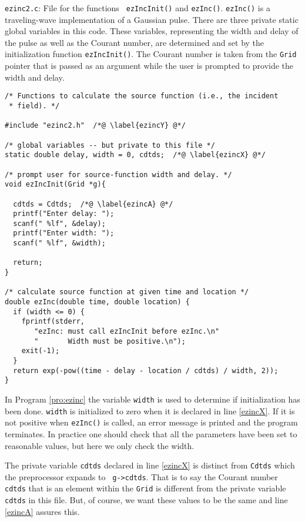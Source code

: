 \begin{program} {\tt ezinc2.c}: File for the functions {\tt
    ezIncInit()} and {\tt ezInc()}.  {\tt ezInc()} is a traveling-wave
  implementation of a Gaussian pulse.  There are three private static
  global variables in this code.  These variables, representing the
  width and delay of the pulse as well as the Courant number, are
  determined and set by the initialization function {\tt ezIncInit()}.
  The Courant number is taken from the {\tt Grid} pointer that is
  passed as an argument while the user is prompted to provide the
  width and delay.
\label{pro:ezinc}
\codemiddle
\begin{lstlisting}
/* Functions to calculate the source function (i.e., the incident
 * field). */ 

#include "ezinc2.h"  /*@ \label{ezincY} @*/

/* global variables -- but private to this file */
static double delay, width = 0, cdtds;  /*@ \label{ezincX} @*/

/* prompt user for source-function width and delay. */
void ezIncInit(Grid *g){

  cdtds = Cdtds;  /*@ \label{ezincA} @*/
  printf("Enter delay: ");
  scanf(" %lf", &delay);
  printf("Enter width: ");
  scanf(" %lf", &width);

  return;
}

/* calculate source function at given time and location */
double ezInc(double time, double location) {
  if (width <= 0) {
    fprintf(stderr,
       "ezInc: must call ezIncInit before ezInc.\n"
       "       Width must be positive.\n");
    exit(-1);
  }
  return exp(-pow((time - delay - location / cdtds) / width, 2));
}
\end{lstlisting}
\end{program}

In Program \ref{pro:ezinc} the variable {\tt width} is used to
determine if initialization has been done.  {\tt width} is initialized
to zero when it is declared in line \ref{ezincX}.  If it is not
positive when {\tt ezInc()} is called, an error message is printed and
the program terminates.  In practice one should check that all the
parameters have been set to reasonable values, but here we only check
the width.

The private variable {\tt cdtds} declared in line \ref{ezincX} is
distinct from {\tt Cdtds} which the preprocessor expands to {\tt
  g->cdtds}.  That is to say the Courant number {\tt cdtds} that is an
element within the {\tt Grid} is different from the private variable
{\tt cdtds} in this file.  But, of course, we want these values to be
the same and line \ref{ezincA} assures this.

